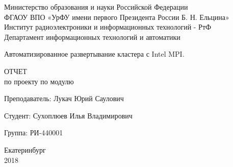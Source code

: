 \begin{center}
    Министерство образования и науки Российской Федерации\\
    ФГАОУ ВПО  «УрФУ имени первого Президента России Б. Н. Ельцина»\\
    Институт радиоэлектроники и информационных технологий - РтФ\\
    Департамент информационных технологий и автоматики
    \par
    \vspace{4.5cm}
    \Large{
      Автоматизированное развертывание кластера с Intel MPI.

      \par
      \vspace{0.5cm}

      ОТЧЕТ\\
      по проекту по модулю
    }

    \vspace{4cm}
    {
      Преподаватель: \hfill Лукач Юрий Саулович
    }
    \par
    {
      Студент: \hfill Сухоплюев Илья Владимирович
    }
    \par
    {
      Группа: \hfill РИ-440001
    }

    \par
    \vspace{3.5cm}
    Екатеринбург\\
    2018
\end{center}
